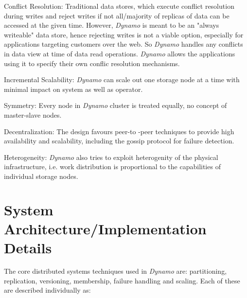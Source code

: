\documentclass[12pt, a4paper]{article}
\begin{document}
Conflict Resolution: Traditional data stores, which execute conflict resolution during writes and reject writes if not all/majority of replicas of data can be accessed at the given time. However, \textit{Dynamo}\cite{DeCandia:2007:DAH:1294261.1294281} is meant to be an "always writeable" data store, hence rejecting writes is not a viable option, especially for applications targeting customers over the web. So \textit{Dynamo}\cite{DeCandia:2007:DAH:1294261.1294281} handles any conflicts in data view at time of data read operations. \textit{Dynamo}\cite{DeCandia:2007:DAH:1294261.1294281} allows the applications using it to specify their own conflic resolution mechanisms.\par

Incremental Scalability: \textit{Dynamo}\cite{DeCandia:2007:DAH:1294261.1294281} can scale out one storage node at a time with minimal impact on system as well as operator.\par

Symmetry: Every node in \textit{Dynamo}\cite{DeCandia:2007:DAH:1294261.1294281} cluster is treated equally, no concept of master-slave nodes.\par

Decentralization: The design favours peer-to -peer techniques to provide high availability and scalability, including the gossip protocol for failure detection.\par

Heterogeneity: \textit{Dynamo}\cite{DeCandia:2007:DAH:1294261.1294281} also tries to exploit heterogenity of the physical infrastructure, i.e. work distribution is proportional to the capabilities of individual storage nodes.\par

\section*{System Architecture/Implementation Details}
The core distributed systems techniques used in \textit{Dynamo}\cite{DeCandia:2007:DAH:1294261.1294281} are: partitioning, replication, versioning, membership, failure handling and scaling. Each of these are described individually as:
\end{document}
